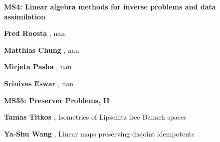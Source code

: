 \documentclass[ILAS2025-program.tex]{subfiles}
\begin{document}
\begin{description}
\begin{description}
        \end{description}
    \begin{description}
    \item[] {\color{mstitle}\textbf{MS4: Linear algebra methods for inverse problems and data assimilation}} 
    \item[] \textbf{Fred Roosta} , nan
        \item[] \textbf{Matthias Chung} , nan
        \item[] \textbf{Mirjeta Pasha} , nan
        \item[] \textbf{Srinivas Eswar} , nan
        \end{description}
    \begin{description}
    \item[] {\color{mstitle}\textbf{MS35: Preserver Problems, II}} 
    \item[] \textbf{Tamas Titkos} , Isometries of Lipschitz free Banach spaces
        \item[] \textbf{Ya-Shu Wang} , Linear maps preserving disjoint idempotents


\end{description}
\end{description}
\end{document}
